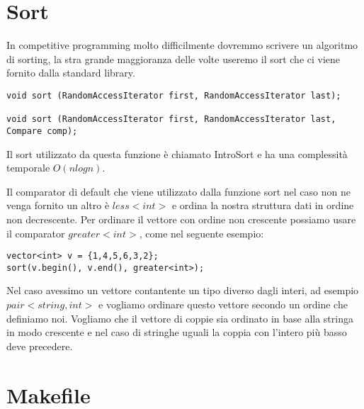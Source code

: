 \documentclass{article}
\begin{document}
\section{Sort}

In competitive programming molto difficilmente dovremmo scrivere un algoritmo di sorting, la stra grande maggioranza delle volte useremo il sort che ci viene fornito dalla standard library.

\begin{lstlisting}
void sort (RandomAccessIterator first, RandomAccessIterator last);

void sort (RandomAccessIterator first, RandomAccessIterator last, Compare comp);
\end{lstlisting}

Il sort utilizzato da questa funzione è chiamato IntroSort e ha una complessità temporale $O(nlogn)$.

Il comparator di default che viene utilizzato dalla funzione sort nel caso non ne venga fornito un altro è $less<int>$ e ordina la nostra struttura dati in ordine non decrescente. Per ordinare il vettore con ordine non crescente possiamo usare il comparator $greater<int>$, come nel seguente esempio:

\begin{lstlisting}
vector<int> v = {1,4,5,6,3,2};
sort(v.begin(), v.end(), greater<int>);
\end{lstlisting}

Nel caso avessimo un vettore contantente un tipo diverso dagli interi, ad esempio $pair<string, int>$ e vogliamo ordinare questo vettore secondo un ordine che definiamo noi. Vogliamo che il vettore di coppie sia ordinato in base alla stringa in modo crescente e nel caso di stringhe uguali la coppia con l'intero più basso deve precedere.



\section{Makefile}


\end{document}
